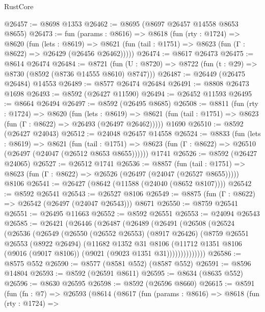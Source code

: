 \begin{lexlean}{RustCore}
\begin{coremodule}
@26457 := @8698 @1353
@26462 := @8695 (@8697 @26457 @14558 @8653 @8655)
@26473 := fun (params : @8616) =>
  @8618
    (fun (rty : @1724) =>
    @8620
      (fun (lets : @8619) =>
      @8621 (fun (tail : @1751) => @8623 (fun (Γ : @8622) => @26429 (@26456 @26462)))))
@26474 := @8617 @26473
@26475 := @8614 @26474
@26484 := @8721
    (fun (U : @8720) => @8722 (fun (t : @29) => @8730 (@8592 (@8736 @14555 @8610) @8747)))
@26487 := @26449 (@26475 @26484) @14553
@26489 := @8577 @26474 @26484
@26491 := @8808 @26473 @1698
@26493 := @8592 (@26427 @11590)
@26494 := @26452 @11593
@26495 := @8664 @26494
@26497 := @8592 (@26495 @8685)
@26508 := @8811
    (fun (rty : @1724) =>
    @8620
      (fun (lets : @8619) =>
      @8621 (fun (tail : @1751) => @8623 (fun (Γ : @8622) => @26493 (@26497 @26462)))))
    @1690
@26510 := @8592 (@26427 @24043)
@26512 := @24048 @26457 @14558
@26524 := @8833
    (fun (lets : @8619) =>
    @8621
      (fun (tail : @1751) =>
      @8623 (fun (Γ : @8622) => @26510 (@26497 (@24047 (@26512 @8653 @8655))))))
    @1741
@26526 := @8592 (@26427 @24065)
@26527 := @26512 @1741
@26536 := @8857
    (fun (tail : @1751) => @8623 (fun (Γ : @8622) => @26526 (@26497 (@24047 (@26527 @8655)))))
    @8106
@26541 := @26427 (@8642 (@11588 (@24040 (@8652 @8107))))
@26542 := @8592 @26541
@26543 := @26527 @8106
@26549 := @8875 (fun (Γ : @8622) => @26542 (@26497 (@24047 @26543))) @8671
@26550 := @8759 @26541
@26551 := @26495 @11663
@26552 := @8592 @26551
@26553 := @24094 @26543
@26585 := @26421
    (@26446
      (@26487
        (@26489
          (@26491
            (@26508
              (@26524
                (@26536
                  (@26549
                    (@26550
                      (@26552 @26553)
                      (@8917 @26426)
                      (@8759
                        @26551
                        @26553
                        (@8922 @26494)
                        (@11682
                          @1352
                          @31
                          @8106
                          (@11712
                            @1351
                            @8106
                            (@9016 (@9017 @8106))
                            (@9021 (@9023 @1351 @31))))))))))))))
@26586 := @8575 @552
@26590 := @8577 (@8581 @552) (@8587 @552)
@26591 := @8596 @14804
@26593 := @8592 (@26591 @8611)
@26595 := @8634 (@8635 @552)
@26596 := @8630 @26595
@26598 := @8592 (@26596 @8660)
@26615 := @8591
    (fun (fn : @7) =>
    @26593
      (@8614
        (@8617
          (fun (params : @8616) =>
          @8618
            (fun (rty : @1724) =>

\end{coremodule}
\end{lexlean}
